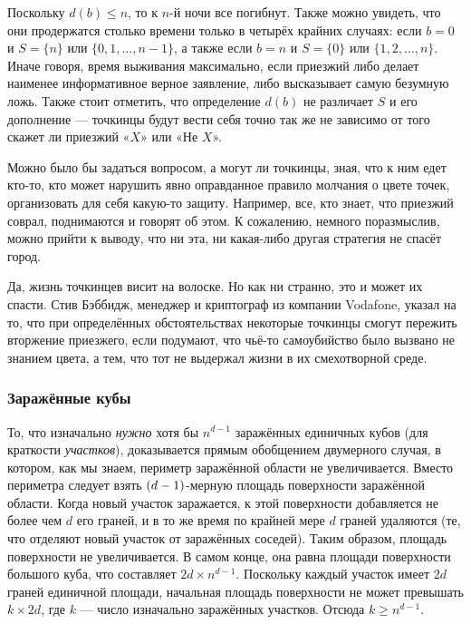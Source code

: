 Поскольку $d(b) \le n$, то к $n$-й ночи все погибнут.
Также можно увидеть, что они продержатся столько времени только в четырёх крайних случаях:
если $b=0$ и $S=\{n\}$ или $\{0,1,\dots,n-1\}$,
а также если $b=n$ и $S=\{0\}$ или $\{1,2,\dots,n\}$.
Иначе говоря, время выживания максимально, если приезжий либо делает наименее информативное верное заявление,
либо высказывает самую безумную ложь.
Также стоит отметить, что определение $d(b)$ не различает $S$ и его дополнение --- точкинцы будут вести себя точно так же не зависимо от того скажет ли приезжий «$X$» или «Не $X$».

Можно было бы задаться вопросом, а могут ли точкинцы, зная, что к ним едет кто-то, кто может нарушить явно оправданное правило молчания о цвете точек, организовать для себя какую-то защиту.
Например, все, кто знает, что приезжий соврал, поднимаются и говорят об этом.
К сожалению, немного поразмыслив, можно прийти к выводу, что ни эта, ни какая-либо другая стратегия не спасёт город.

Да, жизнь точкинцев висит на волоске.
Но как ни странно, это и может их спасти.
Стив Бэббидж, менеджер и криптограф из компании Vodafone, указал на то, что при определённых обстоятельствах некоторые точкинцы смогут пережить вторжение приезжего, если подумают, что чьё-то самоубийство было вызвано не знанием цвета, а тем, что тот не выдержал жизни в их смехотворной среде.

\subsubsection*{Заражённые кубы}

То, что изначально \emph{нужно} хотя бы $n^{d-1}$ заражённых единичных кубов (для краткости \emph{участков}), доказывается прямым обобщением двумерного случая, в котором, как мы знаем, периметр заражённой области не увеличивается.
Вместо периметра следует взять $(d\z-1)$-мерную площадь поверхности заражённой области.
Когда новый участок заражается, к этой поверхности добавляется не более чем $d$ его граней,
и в то же время по крайней мере $d$ граней удаляются (те, что отделяют новый участок от заражённых соседей).
Таким образом, площадь поверхности не увеличивается.
В самом конце, она равна площади поверхности большого куба, что составляет $2d \times n^{d-1}$.
Поскольку каждый участок имеет $2d$ граней единичной площади,
начальная площадь поверхности не может превышать $k \times 2d$,
где $k$ --- число изначально заражённых участков.
Отсюда $k\geqslant n^{d-1}$.


